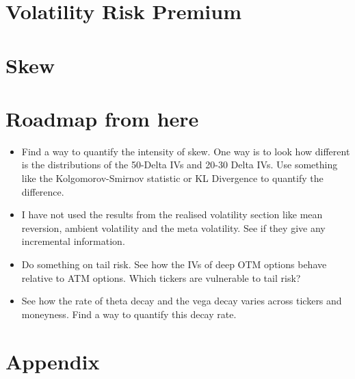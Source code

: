 \documentclass{article}[16pt]
\begin{document}
\section[VRP]{Volatility Risk Premium}


\section[Skew]{Skew}


\section{Roadmap from here}
 
\begin{itemize}
    \item Find a way to quantify the intensity of skew. One way is to look how different is the distributions of the 50-Delta IVs and 20-30 Delta IVs. Use something like the Kolgomorov-Smirnov statistic or KL Divergence to quantify the difference.
    \item I have not used the results from the realised volatility section like mean reversion, ambient volatility and the meta volatility. See if they give any incremental information.
    \item Do something on tail risk. See how the IVs of deep OTM options behave relative to ATM options. Which tickers are vulnerable to tail risk?
    \item See how the rate of theta decay and the vega decay varies across tickers and moneyness. Find a way to quantify this decay rate.
\end{itemize}

\printbibliography
\section{Appendix}

\end{document}
